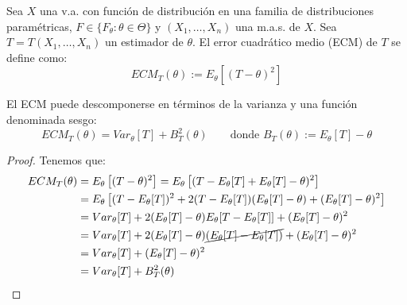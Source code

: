\begin{prop}
    Sea $X$ una v.a. con función de distribución en una familia de distribuciones paramétricas, $F \in \{F_\theta : \theta \in \Theta\}$ y $(X_1, \ldots, X_n)$ una m.a.s. de $X$. Sea $T = T(X_1, \ldots, X_n)$ un estimador de $\theta$. El error cuadrático medio (ECM) de $T$ se define como:
    \begin{equation*}
        ECM_T(\theta) := E_\theta\left[(T - \theta)^2\right]
    \end{equation*}

    El ECM puede descomponerse en términos de la varianza y una función denominada sesgo:
    \begin{equation*}
        ECM_T(\theta) = Var_\theta[T] + B^2_T(\theta)\qquad \text{donde } B_T(\theta) := E_\theta[T] - \theta
    \end{equation*}
    \begin{proof}
        Tenemos que:
        \begin{align*}
            ECM_T(\theta)
            &= E_\theta\left[(T - \theta)^2\right] 
            = E_\theta\left[(T - E_\theta[T] + E_\theta[T] - \theta)^2\right] \\
            &= E_\theta\left[(T - E_\theta[T])^2 + 2(T - E_\theta[T])(E_\theta[T] - \theta) + (E_\theta[T] - \theta)^2\right] \\
            &= Var_\theta[T] + 2(E_\theta[T] - \theta)E_\theta[T - E_\theta[T]] + (E_\theta[T] - \theta)^2 \\
            &= Var_\theta[T] + 2(E_\theta[T] - \theta)\cancel{(E_\theta[T] - E_\theta[T])} + (E_\theta[T] - \theta)^2 \\
            &= Var_\theta[T] + (E_\theta[T] - \theta)^2 \\
            &= Var_\theta[T] + B^2_T(\theta)
        \end{align*}
    \end{proof}
\end{prop}

